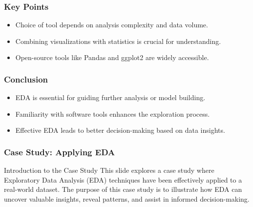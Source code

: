 \documentclass[aspectratio=169]{beamer}
\begin{document}
\begin{frame}
    \frametitle{Key Points}
    \begin{itemize}
        \item Choice of tool depends on analysis complexity and data volume.
        \item Combining visualizations with statistics is crucial for understanding.
        \item Open-source tools like Pandas and ggplot2 are widely accessible.
    \end{itemize}
\end{frame}

\begin{frame}
    \frametitle{Conclusion}
    \begin{itemize}
        \item EDA is essential for guiding further analysis or model building.
        \item Familiarity with software tools enhances the exploration process.
        \item Effective EDA leads to better decision-making based on data insights.
    \end{itemize}
\end{frame}

\begin{frame}
    \frametitle{Case Study: Applying EDA}
    \begin{block}{Introduction to the Case Study}
        This slide explores a case study where Exploratory Data Analysis (EDA) techniques have been effectively applied to a real-world dataset.
        The purpose of this case study is to illustrate how EDA can uncover valuable insights, reveal patterns, and assist in informed decision-making.
    \end{block}
\end{frame}
\end{document}
